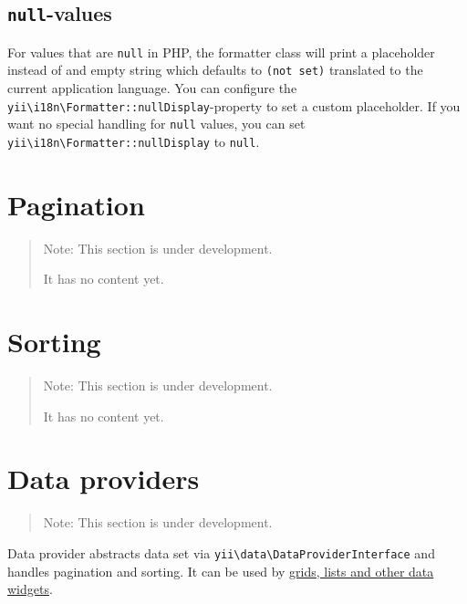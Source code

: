 \subsection{\lstinline|null|-values \label{output-formatter.md::null-values}}
For values that are \lstinline|null| in PHP, the formatter class will print a placeholder instead of and empty string which
defaults to \lstinline|(not set)| translated to the current application language. You can configure the
\texttt{yii{\allowbreak{}\textbackslash}i18n{\allowbreak{}\textbackslash}Formatter\allowbreak{}::\allowbreak{}nullDisplay}-property to set a custom placeholder.
If you want no special handling for \lstinline|null| values, you can set \texttt{yii{\allowbreak{}\textbackslash}i18n{\allowbreak{}\textbackslash}Formatter\allowbreak{}::\allowbreak{}nullDisplay} to \lstinline|null|.



\label{output-pagination.md}\section{Pagination}
\begin{quote}Note: This section is under development.

It has no content yet.

\end{quote}


\label{output-sorting.md}\section{Sorting}
\begin{quote}Note: This section is under development.

It has no content yet.

\end{quote}


\label{output-data-providers.md}\section{Data providers}
\begin{quote}Note: This section is under development.

\end{quote}
Data provider abstracts data set via \texttt{yii{\allowbreak{}\textbackslash}data{\allowbreak{}\textbackslash}DataProviderInterface} and handles pagination and sorting.
It can be used by \hyperref[output-data-widgets.md]{grids, lists and other data widgets}.

